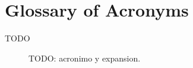 \chapter*{Glossary of Acronyms}
\begin{description}
    \item[TODO] TODO: acronimo y expansion.
\end{description}
